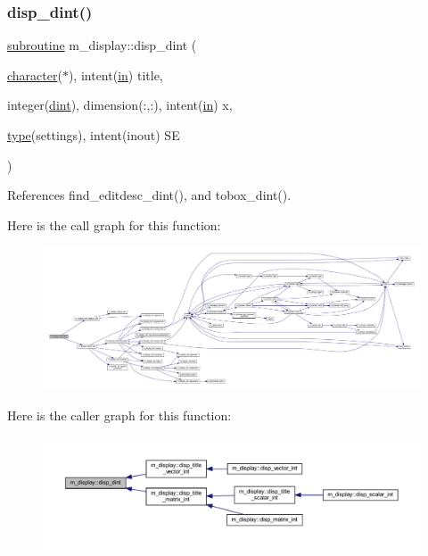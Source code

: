 \subsubsection{\texorpdfstring{disp\+\_\+dint()}{disp\_dint()}}
{\footnotesize\ttfamily \hyperlink{M__stopwatch_83_8txt_acfbcff50169d691ff02d4a123ed70482}{subroutine} m\+\_\+display\+::disp\+\_\+dint (\begin{DoxyParamCaption}\item[{\hyperlink{option__stopwatch_83_8txt_abd4b21fbbd175834027b5224bfe97e66}{character}($\ast$), intent(\hyperlink{M__journal_83_8txt_afce72651d1eed785a2132bee863b2f38}{in})}]{title,  }\item[{integer(\hyperlink{namespacem__display_a73f772e9702cad6f40b78364fde2c7cd}{dint}), dimension(\+:,\+:), intent(\hyperlink{M__journal_83_8txt_afce72651d1eed785a2132bee863b2f38}{in})}]{x,  }\item[{\hyperlink{stop__watch_83_8txt_a70f0ead91c32e25323c03265aa302c1c}{type}(settings), intent(inout)}]{SE }\end{DoxyParamCaption})\hspace{0.3cm}{\ttfamily [private]}}



References find\+\_\+editdesc\+\_\+dint(), and tobox\+\_\+dint().

Here is the call graph for this function\+:
\nopagebreak
\begin{figure}[H]
\begin{center}
\leavevmode
\includegraphics[width=350pt]{namespacem__display_a0e150cc23de78529e22b17b1873a9e6e_cgraph}
\end{center}
\end{figure}
Here is the caller graph for this function\+:
\nopagebreak
\begin{figure}[H]
\begin{center}
\leavevmode
\includegraphics[width=350pt]{namespacem__display_a0e150cc23de78529e22b17b1873a9e6e_icgraph}
\end{center}
\end{figure}
\mbox{\label{namespacem__display_ac6960db2f07da55b2c8a72f30531ed97}} 
